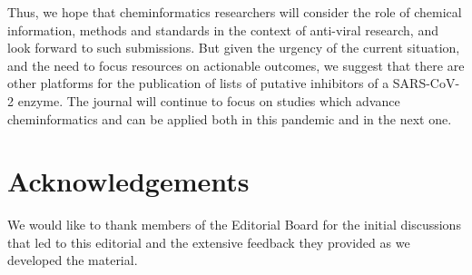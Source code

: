 \documentclass{bmcart}
\begin{document}
Thus, we hope that cheminformatics researchers will consider the role
of chemical information, methods and standards in the context of
anti-viral research, and look forward to such submissions. But given
the urgency of the current situation, and the need to focus resources
on actionable outcomes, we suggest that there are other platforms for
the publication of lists of putative inhibitors of a SARS-CoV-2
enzyme. The journal will continue to focus on studies which advance
cheminformatics and can be applied both in this pandemic and in the
next one.

\section*{Acknowledgements}
We would like to thank members of the Editorial Board for the initial
discussions that led to this editorial and the extensive feedback they
provided as we developed the material.
\end{document}
